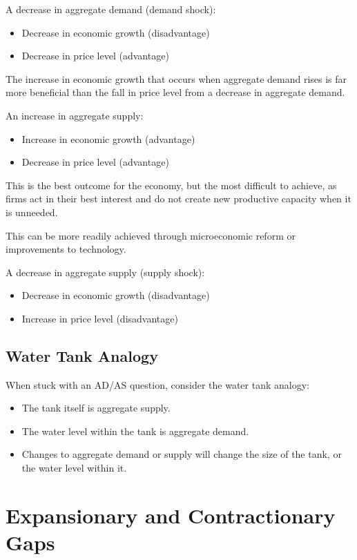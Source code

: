 \documentclass[a4paper,11pt]{report}
\begin{document}
A decrease in aggregate demand (demand shock):

\begin{itemize}
\item Decrease in economic growth (disadvantage)
\item Decrease in price level (advantage)
\end{itemize}

The increase in economic growth that occurs when aggregate demand rises is far
more beneficial than the fall in price level from a decrease in aggregate
demand.

An increase in aggregate supply:

\begin{itemize}
\item Increase in economic growth (advantage)
\item Decrease in price level (advantage)
\end{itemize}

This is the best outcome for the economy, but the most difficult to achieve, as
firms act in their best interest and do not create new productive capacity when
it is unneeded.

This can be more readily achieved through microeconomic reform or improvements
to technology.

A decrease in aggregate supply (supply shock):

\begin{itemize}
\item Decrease in economic growth (disadvantage)
\item Increase in price level (disadvantage)
\end{itemize}

\subsection{Water Tank Analogy}

When stuck with an AD/AS question, consider the water tank analogy:

\begin{itemize}
\item The tank itself is aggregate supply.
\item The water level within the tank is aggregate demand.
\item Changes to aggregate demand or supply will change the size of the tank, or
	the water level within it.
\end{itemize}


\section{Expansionary and Contractionary Gaps}
\end{document}
